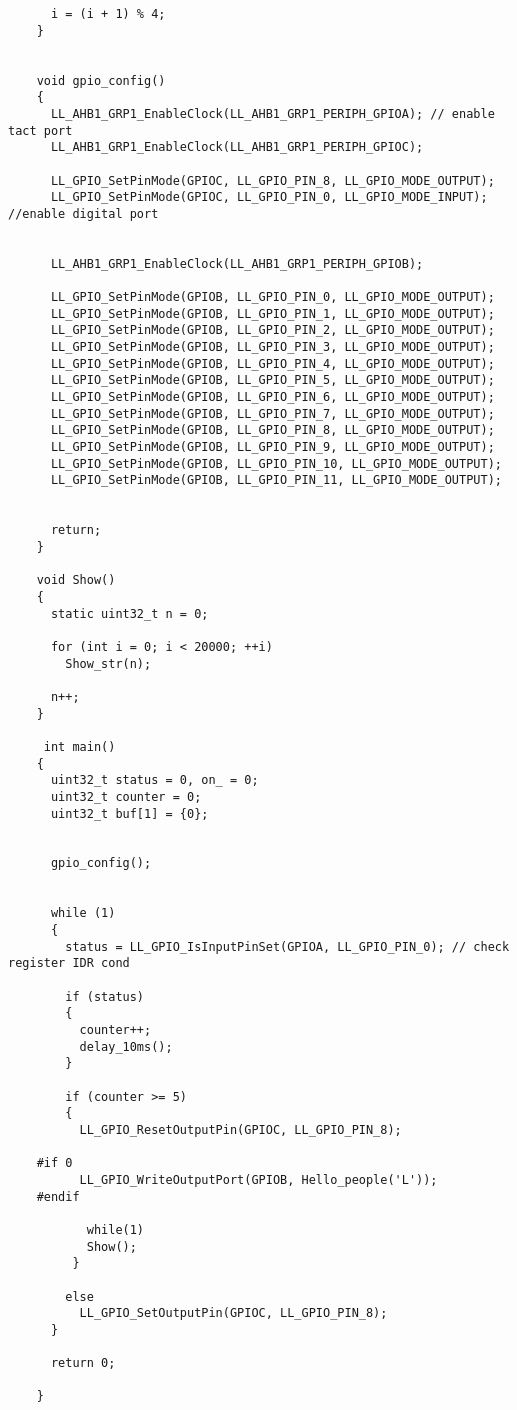 \begin{verbatim}
      i = (i + 1) % 4;
    }
    
    
    void gpio_config()
    {  
      LL_AHB1_GRP1_EnableClock(LL_AHB1_GRP1_PERIPH_GPIOA); // enable tact port
      LL_AHB1_GRP1_EnableClock(LL_AHB1_GRP1_PERIPH_GPIOC);
      
      LL_GPIO_SetPinMode(GPIOC, LL_GPIO_PIN_8, LL_GPIO_MODE_OUTPUT);
      LL_GPIO_SetPinMode(GPIOC, LL_GPIO_PIN_0, LL_GPIO_MODE_INPUT); //enable digital port
    
      
      LL_AHB1_GRP1_EnableClock(LL_AHB1_GRP1_PERIPH_GPIOB);
        
      LL_GPIO_SetPinMode(GPIOB, LL_GPIO_PIN_0, LL_GPIO_MODE_OUTPUT);
      LL_GPIO_SetPinMode(GPIOB, LL_GPIO_PIN_1, LL_GPIO_MODE_OUTPUT);
      LL_GPIO_SetPinMode(GPIOB, LL_GPIO_PIN_2, LL_GPIO_MODE_OUTPUT);
      LL_GPIO_SetPinMode(GPIOB, LL_GPIO_PIN_3, LL_GPIO_MODE_OUTPUT);
      LL_GPIO_SetPinMode(GPIOB, LL_GPIO_PIN_4, LL_GPIO_MODE_OUTPUT);
      LL_GPIO_SetPinMode(GPIOB, LL_GPIO_PIN_5, LL_GPIO_MODE_OUTPUT);
      LL_GPIO_SetPinMode(GPIOB, LL_GPIO_PIN_6, LL_GPIO_MODE_OUTPUT);
      LL_GPIO_SetPinMode(GPIOB, LL_GPIO_PIN_7, LL_GPIO_MODE_OUTPUT);
      LL_GPIO_SetPinMode(GPIOB, LL_GPIO_PIN_8, LL_GPIO_MODE_OUTPUT);
      LL_GPIO_SetPinMode(GPIOB, LL_GPIO_PIN_9, LL_GPIO_MODE_OUTPUT);
      LL_GPIO_SetPinMode(GPIOB, LL_GPIO_PIN_10, LL_GPIO_MODE_OUTPUT);
      LL_GPIO_SetPinMode(GPIOB, LL_GPIO_PIN_11, LL_GPIO_MODE_OUTPUT);
    
      
      return;
    }
    
    void Show()
    {
      static uint32_t n = 0;
      
      for (int i = 0; i < 20000; ++i)
        Show_str(n);
      
      n++;
    }
    
     int main()
    {
      uint32_t status = 0, on_ = 0;
      uint32_t counter = 0;
      uint32_t buf[1] = {0};
    
      
      gpio_config();
    
      
      while (1)
      {
        status = LL_GPIO_IsInputPinSet(GPIOA, LL_GPIO_PIN_0); // check register IDR cond
     
        if (status)
        {
          counter++; 
          delay_10ms();
        }
            
        if (counter >= 5)
        {
          LL_GPIO_ResetOutputPin(GPIOC, LL_GPIO_PIN_8);
            
    #if 0
          LL_GPIO_WriteOutputPort(GPIOB, Hello_people('L'));
    #endif
            
           while(1)
           Show();
         }
       
        else
          LL_GPIO_SetOutputPin(GPIOC, LL_GPIO_PIN_8);
      } 
      
      return 0;
    
    }
    
    
    \end{verbatim}
    